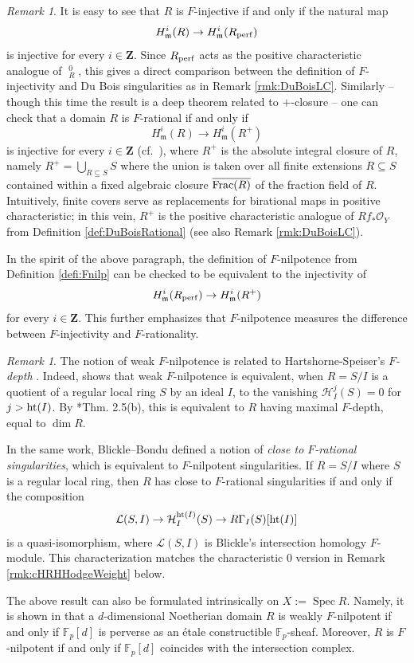\documentclass[letterpaper,11pt]{amsart}
\DeclareMathOperator{\DDB}{\underline{\Omega}}
\theoremstyle{plain}
\theoremstyle{definition}
\theoremstyle{remark}
\newtheorem{rmk}[thm]{Remark}
\def\Z{{\mathbf Z}}
\def\cH{\mathcal{H}}
\def\cL{\mathcal{L}}
\def\cO{\mathcal{O}}
\def\frm{\mathfrak{m}}
\def\m{\mathfrak{m}} %
\DeclareMathOperator{\Spec} {Spec}
\begin{document}
\begin{rmk} \label{rmk:FinjPerf}
It is easy to see that $R$ is $F$-injective if and only if the natural map
\[
H^i_\frm(R) \to H^i_\frm(R_{\rm perf})
\]
is injective for every $i \in \Z$. Since $R_{\rm perf}$ acts as the positive characteristic analogue of $\DDB^0_R$, this gives a direct comparison between the definition of $F$-injectivity and Du Bois singularities as in Remark \ref{rmk:DuBoisLC}. Similarly -- though this time the result is a deep theorem related to $+$-closure -- one can check that a domain $R$ is $F$-rational if and only if
\[
H^i_\m(R) \to H^i_\m(R^+)
\]
is injective for every $i \in \Z$ (cf.\ \cites{Smith94, HH92}), where $R^+$ is the absolute integral closure of $R$, namely $R^+ = \bigcup_{R \subseteq S} S$ where the union is taken over all finite extensions $R \subseteq S$ contained within a fixed algebraic closure $\overline{{\rm Frac}(R)}$ of the fraction field of $R$. Intuitively, finite covers serve as replacements for birational maps in positive characteristic; in this vein, $R^+$ is the positive characteristic analogue of $Rf_*\cO_Y$ from Definition \ref{def:DuBoisRational} (see also Remark \ref{rmk:DuBoisLC}).

In the spirit of the above paragraph, the definition of $F$-nilpotence from Definition \ref{defi:Fnilp} can be checked to be equivalent to the injectivity of
\[
H^i_\m(R_{\rm perf}) \to H^i_\m(R^+)
\]
for every $i \in \Z$. This further emphasizes that $F$-nilpotence measures the difference between $F$-injectivity and $F$-rationality.
\end{rmk}


\begin{rmk} \label{rmk:BB} The notion of weak $F$-nilpotence is related to Hartshorne-Speiser's \emph{$F$-depth} \cite{HartshorneSpeiser}. Indeed, \cite{BlickleBondu} shows that weak $F$-nilpotence is equivalent, when $R = S/I$ is a quotient of a regular local ring $S$ by an ideal $I$, to the vanishing $\cH^j_I(S) = 0$ for $j > {\rm ht}(I)$. By \cite{HartshorneSpeiser}*{Thm. 2.5(b)}, this is equivalent to $R$ having maximal $F$-depth, equal to $\dim R$.

In the same work, Blickle--Bondu defined a notion of \emph{close to $F$-rational singularities}, which is equivalent to $F$-nilpotent singularities. If $R = S/I$ where $S$ is a regular local ring, then $R$ has close to $F$-rational singularities if and only if the composition
\[ \cL(S,I) \to \cH^{{\rm ht}(I)}_I(S) \to R\Gamma_I(S)[{\rm ht}(I)]\]is a quasi-isomorphism, where $\cL(S,I)$ is Blickle's intersection homology $F$-module. This characterization matches the characteristic $0$ version in Remark \ref{rmk:cHRHHodgeWeight} below.

The above result can also be formulated intrinsically on $X := \Spec R$. Namely, it is shown in \cite{BBLSZ} that a $d$-dimensional Noetherian domain $R$ is weakly $F$-nilpotent if and only if $\mathbb{F}_p[d]$ is perverse as an \'etale constructible $\mathbb{F}_p$-sheaf. Moreover, $R$ is $F$-nilpotent if and only if $\mathbb{F}_p[d]$ coincides with the intersection complex.
\end{rmk}
\end{document}

